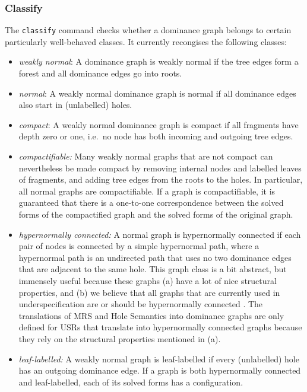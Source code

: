 \subsubsection{Classify} \label{sec:op-classify}

The \verb?classify? command checks whether a dominance graph belongs
to certain particularly well-behaved classes. It currently
recongises the following classes:

\begin{itemize}
\item \emph{weakly normal}: A dominance graph is weakly normal
\cite{bodirsky-weakly-normal-constraints} if the tree edges form a
forest and all dominance edges go into roots.
\item \emph{normal}: A weakly normal dominance graph is normal
\cite{Althaus-J.Algo.} if all dominance edges also start in
(unlabelled) holes.
\item \emph{compact}: A weakly normal dominance graph is compact if
all fragments have depth zero or one, i.e.\ no node has both incoming
and outgoing tree edges.
\item \emph{compactifiable:} Many weakly normal graphs that are not
compact can nevertheless be made compact by removing internal nodes
and labelled leaves of fragments, and adding tree edges from the roots
to the holes. In particular, all normal graphs are compactifiable. If
a graph is compactifiable, it is guaranteed that there is a one-to-one
correspondence between the solved forms of the compactified graph and
the solved forms of the original graph.
\item \emph{hypernormally connected:} A normal graph is hypernormally
connected \cite{KolNieTha03,Koller04} if each pair of nodes is
connected by a simple hypernormal path, where a hypernormal path is an
undirected path that uses no two dominance edges that are adjacent to
the same hole. This graph class is a bit abstract, but immensely
useful because these graphs (a) have a lot of nice structural
properties, and (b) we believe that all graphs that are currently used
in underspecification are or should be hypernormally connected
\cite{FucKolNieTha04}. The translations of MRS and Hole Semantics into dominance graphs are only defined for USRs that translate into hypernormally connected graphs because they rely on the structural properties mentioned in (a).
\item \emph{leaf-labelled:} A weakly normal graph is leaf-labelled
\cite{KolNieTha03} if every (unlabelled) hole has an outgoing
dominance edge. If a graph is both hypernormally connected and
leaf-labelled, each of its solved forms has a configuration.
\end{itemize}



